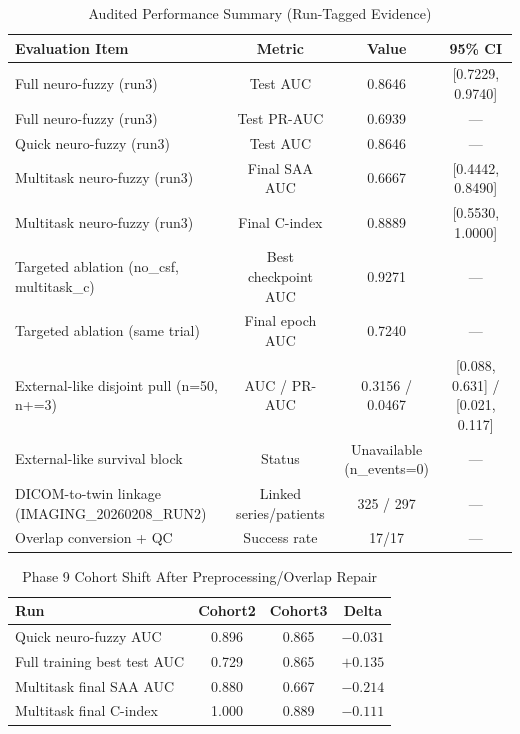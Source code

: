 \documentclass[journal,twoside,web]{ieeecolor}
\begin{document}
\begin{table}[!t]
\caption{Audited Performance Summary (Run-Tagged Evidence)}
\label{tab:results}
\centering
\footnotesize
\begin{tabular}{lccc}
\toprule
\textbf{Evaluation Item} & \textbf{Metric} & \textbf{Value} & \textbf{95\% CI} \\
\midrule
Full neuro-fuzzy (run3) & Test AUC & 0.8646 & [0.7229, 0.9740] \\
Full neuro-fuzzy (run3) & Test PR-AUC & 0.6939 & --- \\
Quick neuro-fuzzy (run3) & Test AUC & 0.8646 & --- \\
Multitask neuro-fuzzy (run3) & Final SAA AUC & 0.6667 & [0.4442, 0.8490] \\
Multitask neuro-fuzzy (run3) & Final C-index & 0.8889 & [0.5530, 1.0000] \\
Targeted ablation (no\_csf, multitask\_c) & Best checkpoint AUC & 0.9271 & --- \\
Targeted ablation (same trial) & Final epoch AUC & 0.7240 & --- \\
External-like disjoint pull (n=50, n+=3) & AUC / PR-AUC & 0.3156 / 0.0467 & [0.088, 0.631] / [0.021, 0.117] \\
External-like survival block & Status & Unavailable (n\_events=0) & --- \\
DICOM-to-twin linkage (IMAGING\_20260208\_RUN2) & Linked series/patients & 325 / 297 & --- \\
Overlap conversion + QC & Success rate & 17/17 & --- \\
\bottomrule
\end{tabular}
\end{table}

\begin{table}[!t]
\caption{Phase 9 Cohort Shift After Preprocessing/Overlap Repair}
\label{tab:phase9_cohort_shift}
\centering
\footnotesize
\begin{tabular}{lccc}
\toprule
\textbf{Run} & \textbf{Cohort2} & \textbf{Cohort3} & \textbf{Delta} \\
\midrule
Quick neuro-fuzzy AUC & 0.896 & 0.865 & $-0.031$ \\
Full training best test AUC & 0.729 & 0.865 & $+0.135$ \\
Multitask final SAA AUC & 0.880 & 0.667 & $-0.214$ \\
Multitask final C-index & 1.000 & 0.889 & $-0.111$ \\
\bottomrule
\end{tabular}
\end{table}
\end{document}
